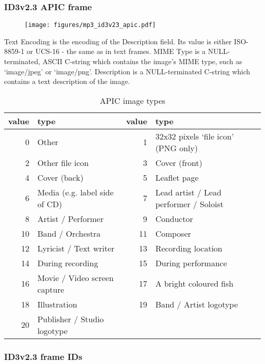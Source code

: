 \subsubsection{ID3v2.3 APIC frame}
\begin{figure}[h]
\texttt{[image: figures/mp3\_id3v23\_apic.pdf]}
\end{figure}
Text Encoding is the encoding of the Description field.
Its value is either ISO-8859-1 or UCS-16 - the same as in
text frames.
MIME Type is a NULL-terminated, ASCII C-string which contains the
image's MIME type, such as `image/jpeg' or `image/png'.
Description is a NULL-terminated C-string which contains
a text description of the image.
\begin{table}[h]
{
\begin{tabular}{|r|l||r|l|}
\hline
value & type & value & type \\
\hline
0 & Other & 1 & 32x32 pixels `file icon' (PNG only) \\
2 & Other file icon & 3 & Cover (front) \\
4 & Cover (back) & 5 & Leaflet page \\
6 & Media (e.g. label side of CD) & 7 & Lead artist / Lead performer / Soloist \\
8 & Artist / Performer & 9 & Conductor \\
10 & Band / Orchestra & 11 & Composer \\
12 & Lyricist / Text writer & 13 & Recording location \\
14 & During recording & 15 & During performance \\
16 & Movie / Video screen capture & 17 & A bright coloured fish \\
18 & Illustration & 19 & Band / Artist logotype \\
20 & Publisher / Studio logotype & &  \\
\hline
\end{tabular}
\caption{APIC image types}
}
\end{table}

\pagebreak

\subsubsection{ID3v2.3 frame IDs}

